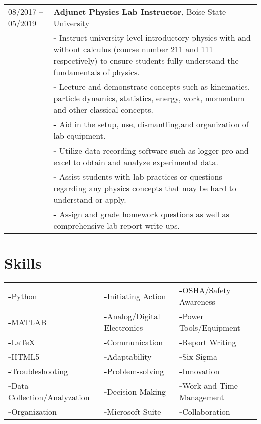 \documentclass[a4paper,12pt]{article}
\begin{document}
\begin{tabularx}{\linewidth}{lX}
08/2017 -- 05/2019  & \textbf{Adjunct Physics Lab Instructor}, Boise State University\\
         & \textbf{-} Instruct university level introductory physics with and without calculus (course number 211 and 111 respectively) to ensure students fully understand the fundamentals of physics. \\
         & \textbf{-} Lecture and demonstrate concepts such as kinematics, particle dynamics, statistics, energy, work, momentum and other classical concepts. \\
         & \textbf{-} Aid in the setup, use, dismantling,and organization of lab equipment.\\
         & \textbf{-} Utilize data recording software such as logger-pro and excel to obtain and analyze experimental data. \\
         & \textbf{-} Assist students with lab practices or questions regarding any physics concepts that may be hard to understand or apply. \\
         & \textbf{-} Assign and grade homework questions as well as comprehensive lab report write ups. \\
\end{tabularx}


\section{Skills}
    \begin{tabularx}{\linewidth}{|X|X|X}
         \textbf{-}Python & \textbf{-}Initiating Action & \textbf{-}OSHA/Safety Awareness \\
         \textbf{-}MATLAB & \textbf{-}Analog/Digital Electronics & \textbf{-}Power Tools/Equipment \\
         \textbf{-}\LaTeX & \textbf{-}Communication & \textbf{-}Report Writing \\
         \textbf{-}HTML5 & \textbf{-}Adaptability & \textbf{-}Six Sigma \\
         \textbf{-}Troubleshooting & \textbf{-}Problem-solving & \textbf{-}Innovation \\
         \textbf{-}Data Collection/Analyzation & \textbf{-}Decision Making & \textbf{-}Work and Time Management \\
         \textbf{-}Organization & \textbf{-}Microsoft Suite & \textbf{-}Collaboration \\
    \end{tabularx}
\end{document}

